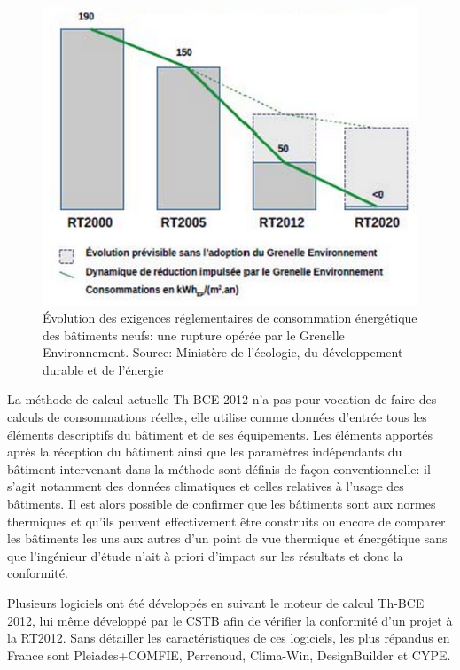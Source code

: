 \begin{figure}[h]
\centering
\includegraphics[scale=0.7]{Images/Evolution_des_performances_des_rt}
\caption{Évolution des exigences réglementaires de consommation énergétique des bâtiments neufs: une rupture opérée par le Grenelle Environnement. Source: Ministère de l'écologie, du développement durable et de l'énergie}
\label{fig:Evolution_des_performances_des_rt}
\end{figure}

La méthode de calcul actuelle Th-BCE 2012 n'a pas pour vocation de faire des calculs de consommations réelles, elle utilise comme données d'entrée tous les éléments descriptifs du bâtiment et de ses équipements. Les éléments apportés après la réception du bâtiment ainsi que les paramètres indépendants du bâtiment intervenant dans la méthode sont définis de façon conventionnelle: il s'agit notamment des données climatiques et celles relatives à l'usage des bâtiments. Il est alors possible de confirmer que les bâtiments sont aux normes thermiques et qu'ils peuvent effectivement être construits ou encore de comparer les bâtiments les uns aux autres d'un point de vue thermique et énergétique sans que l'ingénieur d'étude n'ait à priori d'impact sur les résultats et donc la conformité.

Plusieurs logiciels ont été développés en suivant le moteur de calcul Th-BCE 2012, lui même développé par le CSTB afin de vérifier la conformité d'un projet à la RT2012. Sans détailler les caractéristiques de ces logiciels, les plus répandus en France sont Pleiades+COMFIE, Perrenoud, Clima-Win, DesignBuilder et CYPE.

